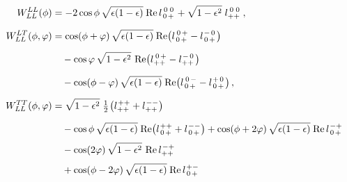 \documentclass[12pt]{article}
\newcommand{\ms}{\mskip 1.5mu}
\newcommand{\re}{\operatorname{Re}}
\newcommand{\rl}[4]{l^{\ms #1 #2}_{#3 #4}}
\newcommand{\0}{{\mskip 2.5mu} 0 {\mskip 2.5mu}}
\begin{document}
%
\begin{align}
  \label{WLL}
W_{LL}^{LL}(\phi) &=
  - 2\cos\phi\, \sqrt{\epsilon (1-\epsilon)}\ms \re\rl{\0}{\0}{\0}{+}
  + \sqrt{1 - \epsilon^2}\; \rl{\0}{\0}{+}{+} \,,
  \phantom{\frac{1}{2}}
\nonumber \\
%
W_{LL}^{LT}(\phi,\varphi) &=
  \cos(\phi + \varphi)\, \sqrt{\epsilon (1-\epsilon)}\ms
  \re\bigl( \rl{\0}{+}{\0}{+} - \rl{-}{\0}{\0}{+} \bigr)
  \phantom{\frac{1}{2}}
\nonumber \\
& \quad{}
  - \cos\varphi\, \sqrt{1 - \epsilon^2}\,
    \re\bigl( \rl{\0}{+}{+}{+} - \rl{-}{\0}{+}{+} \bigr)
  \phantom{\frac{1}{2}}
\nonumber \\
& \quad{}
  - \cos(\phi - \varphi)\, \sqrt{\epsilon (1-\epsilon)}\ms
    \re\bigl( \rl{\0}{-}{\0}{+} - \rl{+}{\0}{\0}{+} \bigr) \,,
  \phantom{\frac{1}{2}}
\nonumber \\
%
W_{LL}^{TT}(\phi,\varphi) &=
  \sqrt{1 - \epsilon^2}\; \tfrac{1}{2}\ms
  \bigl( \rl{+}{+}{+}{+} + \rl{-}{-}{+}{+} \bigr)
  \phantom{\frac{1}{2}}
\nonumber \\
& \quad{}
  - \cos\phi\, \sqrt{\epsilon (1-\epsilon)}\ms
    \re\bigl( \rl{+}{+}{\0}{+} + \rl{-}{-}{\0}{+} \bigr)
  + \cos(\phi + 2\varphi)\, \sqrt{\epsilon (1-\epsilon)}\ms
    \re\rl{-}{+}{\0}{+}
  \phantom{\frac{1}{2}}
\nonumber \\
& \quad{}
  - \cos(2\varphi)\, \sqrt{1 - \epsilon^2}\, \re\rl{-}{+}{+}{+}
\nonumber \\
& \quad{}
  + \cos(\phi - 2\varphi)\, \sqrt{\epsilon (1-\epsilon)}\ms
    \re\rl{+}{-}{\0}{+}
  \phantom{\frac{1}{2}}
\end{align}
\end{document}
